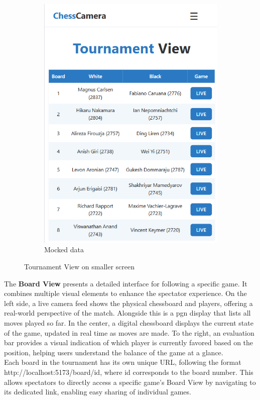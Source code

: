 \begin{figure}[h!]
\begin{subfigure}[h!]{0.4\linewidth}
        \includegraphics[width=\linewidth]{figures/results/frontend/tournament-view/mocked-mobile.png}
        \caption{Mocked data}
        \label{fig:small-tournament-view}
    \end{subfigure}
    \caption{Tournament View on smaller screen}
    \label{fig:small-view-group}
\end{figure}

The \textbf{Board View} presents a detailed interface for following a specific game. It combines multiple visual elements to enhance the spectator experience. On the left side, a live camera feed shows the physical chessboard and players, offering a real-world perspective of the match. Alongside this is a \gls{pgn} display that lists all moves played so far. In the center, a digital chessboard displays the current state of the game, updated in real time as moves are made. To the right, an evaluation bar provides a visual indication of which player is currently favored based on the position, helping users understand the balance of the game at a glance. \\

Each board in the tournament has its own unique URL, following the format http://localhost:5173/board/{id}, where {id} corresponds to the board number. This allows spectators to directly access a specific game's Board View by navigating to its dedicated link, enabling easy sharing of individual games. \\



